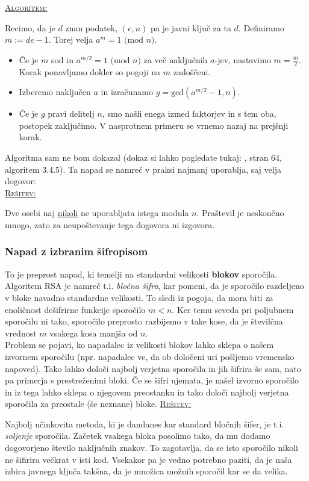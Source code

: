 \documentclass[a4paper, 12pt]{article} %
\newenvironment{matematika}[1]{
\textcolor{bostonuniversityred}{\underline{\textsc{#1:}}}
}{
}
\begin{document}
\begin{matematika}{Algoritem}
Recimo, da je $d$ znan podatek, $(e, n)$ pa je javni ključ za ta $d$. Definiramo $m := de -1$. Torej velja $a^m = 1 \text{ (mod } n)$.
\begin{itemize}[label=]
\item Če je $m$ sod in $a^{m/2} = 1 \text{ (mod } n)$ za več naključnih $a$-jev, nastavimo $m = \frac{m}{2}$. Korak ponavljamo dokler so pogoji na $m$ zadoščeni.
\item Izberemo naključen $a$ in izračunamo $g = \text{gcd}(a^{m/2} - 1, n)$.
\item Če je $g$ pravi delitelj $n$, smo našli enega izmed faktorjev in s tem oba, postopek zaključimo. V nasprotnem primeru se vrnemo nazaj na prejšnji korak. \\
\end{itemize}
\end{matematika}

Algoritma sam ne bom dokazal (dokaz si lahko pogledate tukaj: \cite{clanek}, stran 64, algoritem 3.4.5). Ta napad se namreč v praksi najmanj uporablja, saj velja dogovor: \\
\begin{matematika}{Rešitev}
Dve osebi naj \underline{nikoli} ne uporabljata istega modula $n$. Praštevil je neskončno mnogo, zato za neupoštevanje tega dogovora ni izgovora.
\end{matematika}

\subsubsection{Napad z izbranim šifropisom}

To je preprost napad, ki temelji na standardni velikosti \textbf{blokov} sporočila. Algoritem RSA je namreč t.i. \emph{bločna šifra}, kar pomeni, da je sporočilo razdeljeno v bloke navadno standardne velikosti. To sledi iz pogoja, da mora biti za enoličnost dešifrirne funkcije sporočilo $m < n$. Ker temu seveda pri poljubnem sporočilu ni tako, sporočilo preprosto razbijemo v take kose, da je številčna vrednost $m$ vsakega kosa manjša od $n$. \\
Problem se pojavi, ko napadalec iz velikosti blokov lahko sklepa o našem izvornem sporočilu (npr. napadalec ve, da ob določeni uri pošljemo vremensko napoved). Tako lahko določi najbolj verjetna sporočila in jih šifrira še sam, nato pa primerja s prestreženimi bloki. Če se šifri ujemata, je našel izvorno sporočilo in iz tega lahko sklepa o njegovem preostanku in tako določi najbolj verjetna sporočila za preostale (še neznane) bloke.
\newline
\newline
\begin{matematika}{Rešitev}
Najbolj učinkovita metoda, ki je dandanes kar standard bločnih šifer, je t.i. \emph{soljenje} sporočila. Začetek vsakega bloka posolimo tako, da mu dodamo dogovorjeno število naključnih znakov. To zagotavlja, da se isto sporočilo nikoli ne šifirira večkrat v isti kod. Vsekakor pa je vedno potrebno paziti, da je naša izbira javnega ključa takšna, da je množica možnih sporočil kar se da velika.
\end{matematika}
\end{document}
